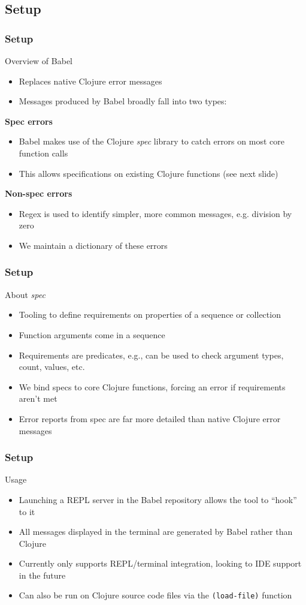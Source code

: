 \documentclass{beamer}
\begin{document}
\subsection{Setup}
\begin{frame}
    \frametitle{Setup}
    Overview of Babel
    \begin{itemize}
        \item Replaces native Clojure error messages
        \item Messages produced by Babel broadly fall into two types:
    \end{itemize}
    \textbf{Spec errors}
    \begin{itemize}
        \item Babel makes use of the Clojure \textit{spec} library to catch errors on most core function calls
        \item This allows specifications on existing Clojure functions (see next slide)
    \end{itemize}
    \textbf{Non-spec errors}
    \begin{itemize}
        \item Regex is used to identify simpler, more common messages, e.g. division by zero
        \item We maintain a dictionary of these errors
    \end{itemize}
\end{frame}

\begin{frame}
    \frametitle{Setup}
    About \textit{spec}
    \begin{itemize}
        \item Tooling to define requirements on properties of a sequence or collection
        \item Function arguments come in a sequence
        \item Requirements are predicates, e.g., can be used to check argument types, count, values, etc.
        \item We bind specs to core Clojure functions, forcing an error if requirements aren't met
        \item Error reports from spec are far more detailed than native Clojure error messages
    \end{itemize}
\end{frame}

\begin{frame}
    \frametitle{Setup}
    Usage
    \begin{itemize}
        \item Launching a REPL server in the Babel repository allows the tool to ``hook'' to it
        \item All messages displayed in the terminal are generated by Babel rather than Clojure
        \item Currently only supports REPL/terminal integration, looking to IDE support in the future
        \item Can also be run on Clojure source code files via the \texttt{(load-file)} function
    \end{itemize}
\end{frame}
\end{document}
